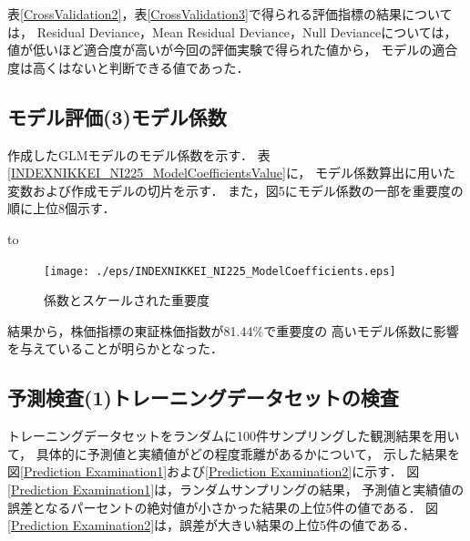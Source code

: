 \documentclass[submit,techrep,noauthor]{ipsj}
\begin{document}
表\ref{CrossValidation2}，表\ref{CrossValidation3}で得られる評価指標の結果については，
Residual Deviance，Mean Residual Deviance，Null Devianceについては，
値が低いほど適合度が高いが今回の評価実験で得られた値から，
モデルの適合度は高くはないと判断できる値であった．

\subsection{モデル評価(3)モデル係数}\label{evaluation3}
作成したGLMモデルのモデル係数を示す．
表\ref{INDEXNIKKEI_NI225_ModelCoefficientsValue}に，
モデル係数算出に用いた変数および作成モデルの切片を示す．
また，図5にモデル係数の一部を重要度の順に上位8個示す．

\begin{table}[h] 
\caption{モデル係数} 
\label{INDEXNIKKEI_NI225_ModelCoefficientsValue}
\hbox to
\end{table}
%
\begin{figure}[h]
\begin{center}
\label{INDEXNIKKEI_NI225_ModelCoefficients}
\texttt{[image: ./eps/INDEXNIKKEI\_NI225\_ModelCoefficients.eps]}
\caption{係数とスケールされた重要度}
\end{center}
\end{figure}

結果から，株価指標の東証株価指数が81.44\%で重要度の
高いモデル係数に影響を与えていることが明らかとなった．

\subsection{予測検査(1)トレーニングデータセットの検査}
トレーニングデータセットをランダムに100件サンプリングした観測結果を用いて，
具体的に予測値と実績値がどの程度乖離があるかについて，
示した結果を図\ref{Prediction Examination1}および\ref{Prediction Examination2}に示す．
図\ref{Prediction Examination1}は，ランダムサンプリングの結果，
予測値と実績値の誤差となるパーセントの絶対値が小さかった結果の上位5件の値である．
図\ref{Prediction Examination2}は，誤差が大きい結果の上位5件の値である．
\end{document}
